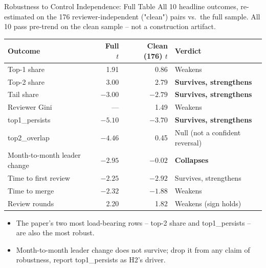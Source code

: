 \begin{frame}{Robustness to Control Independence: Full Table}
All 10 headline outcomes, re-estimated on the 176 reviewer-independent
("clean") pairs vs.\ the full sample. All 10 pass pre-trend on the
clean sample -- not a construction artifact.
\begin{table}
\centering
\scriptsize
\begin{tabular}{lrrl}
\toprule
Outcome & Full $t$ & Clean (176) $t$ & Verdict \\
\midrule
Top-1 share            & 1.91  & 0.86  & Weakens \\
Top-2 share             & 3.00  & 2.79  & \textbf{Survives, strengthens} \\
Tail share               & $-3.00$ & $-2.79$ & \textbf{Survives, strengthens} \\
Reviewer Gini            & ---   & 1.49  & Weakens \\
top1\_persists            & $-5.10$ & $-3.70$ & \textbf{Survives, strengthens} \\
top2\_overlap             & $-4.46$ & 0.45  & Null (not a confident reversal) \\
Month-to-month leader change & $-2.95$ & $-0.02$ & \textbf{Collapses} \\
Time to first review     & $-2.25$ & $-2.92$ & Survives, strengthens \\
Time to merge             & $-2.32$ & $-1.88$ & Weakens \\
Review rounds              & 2.20  & 1.82  & Weakens (sign holds) \\
\bottomrule
\end{tabular}
\end{table}
\begin{itemize}
  \item The paper's two most load-bearing rows -- top-2 share and
        top1\_persists -- are also the most robust.
  \item Month-to-month leader change does not survive; drop it from any
        claim of robustness, report top1\_persists as H2's driver.
\end{itemize}
\end{frame}

